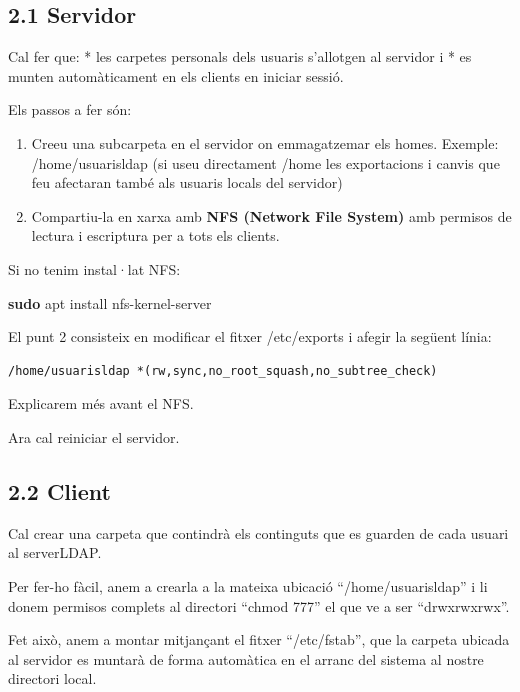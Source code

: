 \documentclass[
  12 pt,
  a4paper,
]{article}
\newenvironment{Shaded}{\begin{snugshade}}{\end{snugshade}}
\newcommand{\FunctionTok}[1]{\textcolor[rgb]{0.13,0.29,0.53}{\textbf{#1}}}
\newcommand{\NormalTok}[1]{#1}
\begin{document}
\subsection{2.1 Servidor}\label{servidor}

Cal fer que: * les carpetes personals dels usuaris s'allotgen al
servidor i * es munten automàticament en els clients en iniciar sessió.

Els passos a fer són:

\begin{enumerate}
\def\labelenumi{\arabic{enumi}.}
\item
  Creeu una subcarpeta en el servidor on emmagatzemar els homes.
  Exemple: /home/usuarisldap (si useu directament /home les exportacions
  i canvis que feu afectaran també als usuaris locals del servidor)
\item
  Compartiu-la en xarxa amb \textbf{NFS (Network File System)} amb
  permisos de lectura i escriptura per a tots els clients.
\end{enumerate}

Si no tenim instal·lat NFS:

\begin{Shaded}
\begin{Highlighting}[]
\FunctionTok{sudo}\NormalTok{ apt install nfs{-}kernel{-}server}
\end{Highlighting}
\end{Shaded}

El punt 2 consisteix en modificar el fitxer /etc/exports i afegir la
següent línia:

\begin{verbatim}
/home/usuarisldap *(rw,sync,no_root_squash,no_subtree_check) 
\end{verbatim}

Explicarem més avant el NFS.

Ara cal reiniciar el servidor.

\subsection{2.2 Client}\label{client}

Cal crear una carpeta que contindrà els continguts que es guarden de
cada usuari al serverLDAP.

Per fer-ho fàcil, anem a crearla a la mateixa ubicació
``/home/usuarisldap'' i li donem permisos complets al directori ``chmod
777'' el que ve a ser ``drwxrwxrwx''.

Fet això, anem a montar mitjançant el fitxer ``/etc/fstab'', que la
carpeta ubicada al servidor es muntarà de forma automàtica en el arranc
del sistema al nostre directori local.
\end{document}
